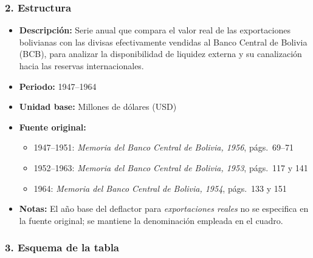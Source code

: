 \documentclass[12pt,a4paper]{article}
\begin{document}
\subsubsection*{2. Estructura}
\begin{itemize}
  \item \textbf{Descripción:} Serie anual que compara el valor real de las exportaciones bolivianas con las divisas efectivamente vendidas al Banco Central de Bolivia (BCB), para analizar la disponibilidad de liquidez externa y su canalización hacia las reservas internacionales.
  \item \textbf{Periodo:} 1947--1964
  \item \textbf{Unidad base:} Millones de dólares (USD)
  \item \textbf{Fuente original:}
    \begin{itemize}
      \item 1947--1951: \emph{Memoria del Banco Central de Bolivia, 1956}, págs.\ 69--71
      \item 1952--1963: \emph{Memoria del Banco Central de Bolivia, 1953}, págs.\ 117 y 141
      \item 1964: \emph{Memoria del Banco Central de Bolivia, 1954}, págs.\ 133 y 151
    \end{itemize}
  \item \textbf{Notas:} El año base del deflactor para \emph{exportaciones reales} no se especifica en la fuente original; se mantiene la denominación empleada en el cuadro.
\end{itemize}

\subsubsection*{3. Esquema de la tabla}
\end{document}
